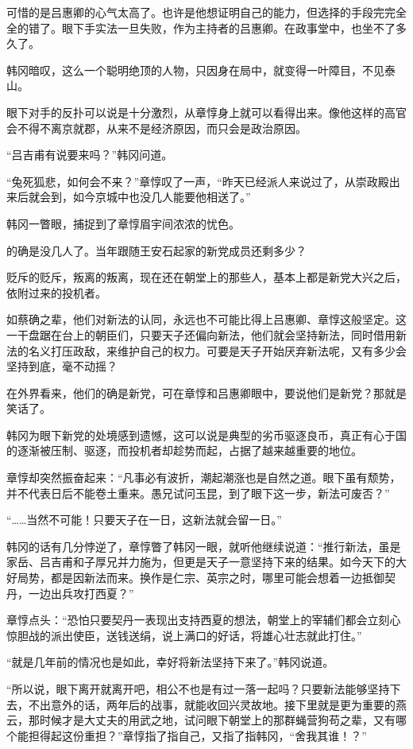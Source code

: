 可惜的是吕惠卿的心气太高了。也许是他想证明自己的能力，但选择的手段完完全全的错了。眼下手实法一旦失败，作为主持者的吕惠卿。在政事堂中，也坐不了多久了。

韩冈暗叹，这么一个聪明绝顶的人物，只因身在局中，就变得一叶障目，不见泰山。

眼下对手的反扑可以说是十分激烈，从章惇身上就可以看得出来。像他这样的高官会不得不离京就郡，从来不是经济原因，而只会是政治原因。

“吕吉甫有说要来吗？”韩冈问道。

“兔死狐悲，如何会不来？”章惇叹了一声，“昨天已经派人来说过了，从崇政殿出来后就会到，如今京城中也没几人能要他相送了。”

韩冈一瞥眼，捕捉到了章惇眉宇间浓浓的忧色。

的确是没几人了。当年跟随王安石起家的新党成员还剩多少？

贬斥的贬斥，叛离的叛离，现在还在朝堂上的那些人，基本上都是新党大兴之后，依附过来的投机者。

如蔡确之辈，他们对新法的认同，永远也不可能比得上吕惠卿、章惇这般坚定。这一干盘踞在台上的朝臣们，只要天子还偏向新法，他们就会坚持新法，同时借用新法的名义打压政敌，来维护自己的权力。可要是天子开始厌弃新法呢，又有多少会坚持到底，毫不动摇？

在外界看来，他们的确是新党，可在章惇和吕惠卿眼中，要说他们是新党？那就是笑话了。

韩冈为眼下新党的处境感到遗憾，这可以说是典型的劣币驱逐良币，真正有心于国的逐渐被压制、驱逐，而投机者却趁势而起，占据了越来越重要的地位。

章惇却突然振奋起来：“凡事必有波折，潮起潮涨也是自然之道。眼下虽有颓势，并不代表日后不能卷土重来。愚兄试问玉昆，到了眼下这一步，新法可废否？”

“……当然不可能！只要天子在一日，这新法就会留一日。”

韩冈的话有几分悖逆了，章惇瞥了韩冈一眼，就听他继续说道：“推行新法，虽是家岳、吕吉甫和子厚兄并力施为，但更是天子一意坚持下来的结果。如今天下的大好局势，都是因新法而来。换作是仁宗、英宗之时，哪里可能会想着一边抵御契丹，一边出兵攻打西夏？”

章惇点头：“恐怕只要契丹一表现出支持西夏的想法，朝堂上的宰辅们都会立刻心惊胆战的派出使臣，送钱送绢，说上满口的好话，将雄心壮志就此打住。”

“就是几年前的情况也是如此，幸好将新法坚持下来了。”韩冈说道。

“所以说，眼下离开就离开吧，相公不也是有过一落一起吗？只要新法能够坚持下去，不出意外的话，两年后的战事，就能收回兴灵故地。接下里就是更为重要的燕云，那时候才是大丈夫的用武之地，试问眼下朝堂上的那群蝇营狗苟之辈，又有哪个能担得起这份重担？”章惇指了指自己，又指了指韩冈，“舍我其谁！？”

